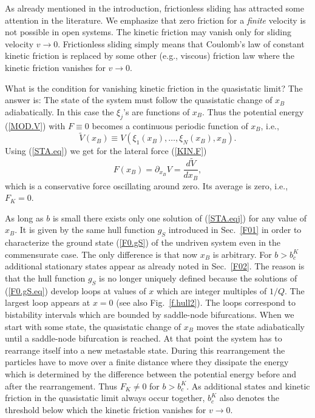 As already mentioned in the introduction, frictionless sliding has
attracted some attention in the literature. We emphasize that zero
friction for a {\em finite\/} velocity is not possible in open
systems. The kinetic friction may vanish only for sliding velocity
$v\to 0$.  Frictionless sliding simply means that Coulomb's law of
constant kinetic friction is replaced by some other (e.g., viscous)
friction law where the kinetic friction vanishes for $v\to 0$. 

What is the condition for vanishing kinetic friction in the
quasistatic limit? The answer is: The state of the system must follow
the quasistatic change of $x_B$ adiabatically. In this case the
$\xi_j$'s are functions of $x_B$. Thus the potential energy
(\ref{MOD.V}) with $F\equiv 0$ becomes a continuous periodic function
of $x_B$, i.e., 
\begin{displaymath}
	\tilde{V}(x_B)\equiv V(\xi_1(x_B),\ldots,\xi_N(x_B),x_B).
\end{displaymath}
Using (\ref{STA.eq}) we get for the lateral force (\ref{KIN.F})
\begin{displaymath}
	F(x_B)=\partial_{x_B}V=\frac{d\tilde V}{dx_B},
\end{displaymath}
which is a conservative force oscillating around zero. Its
average is zero, i.e., $F_K=0$. 

As long as $b$ is small there exists only one solution of
(\ref{STA.eqj}) for any value of $x_B$. It is given by the same hull
function $g_S$ introduced in Sec.~\ref{F01} in order to characterize
the ground state (\ref{F0.gS}) of the undriven system even in the
commensurate case. The only difference is that now $x_B$ is
arbitrary.  For $b>b_c^K$ additional stationary states appear as
already noted in Sec.~\ref{F02}. The reason is that the hull function
$g_S$ is no longer uniquely defined because the solutions of
(\ref{F0.gS.eq}) develop loops at values of $x$ which are integer
multiples of $1/Q$. The largest loop appears at $x=0$ (see also
Fig.~\ref{f.hull2}). The loops correspond to bistability intervals
which are bounded by saddle-node bifurcations. When we start with
some state, the quasistatic change of $x_B$ moves the state
adiabatically until a saddle-node bifurcation is reached. At that
point the system has to rearrange itself into a new metastable state.
During this rearrangement the particles have to move over a finite
distance where they dissipate the energy which is determined by the
difference between the potential energy before and after the 
rearrangement. Thus $F_K\not=0$ for $b>b_c^K$. As additional states
and kinetic friction in the quasistatic limit always occur together,
$b_c^K$ also denotes the threshold below which the kinetic friction
vanishes for $v\to 0$.

